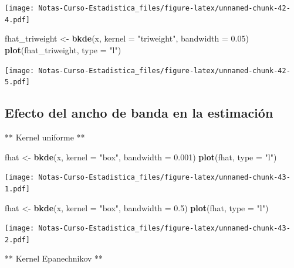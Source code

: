 \documentclass[
  12pt,
]{book}
\newenvironment{Shaded}{\begin{snugshade}}{\end{snugshade}}
\newcommand{\DataTypeTok}[1]{\textcolor[rgb]{0.13,0.29,0.53}{#1}}
\newcommand{\FloatTok}[1]{\textcolor[rgb]{0.00,0.00,0.81}{#1}}
\newcommand{\KeywordTok}[1]{\textcolor[rgb]{0.13,0.29,0.53}{\textbf{#1}}}
\newcommand{\NormalTok}[1]{#1}
\newcommand{\StringTok}[1]{\textcolor[rgb]{0.31,0.60,0.02}{#1}}
\theoremstyle{definition}
\theoremstyle{definition}
\theoremstyle{definition}
\theoremstyle{remark}
\begin{document}
\texttt{[image: Notas-Curso-Estadistica\_files/figure-latex/unnamed-chunk-42-4.pdf]}

\begin{Shaded}
\begin{Highlighting}[]
\NormalTok{fhat_triweight <-}\StringTok{ }\KeywordTok{bkde}\NormalTok{(x, }\DataTypeTok{kernel =} \StringTok{"triweight"}\NormalTok{, }\DataTypeTok{bandwidth =} \FloatTok{0.05}\NormalTok{)}
\KeywordTok{plot}\NormalTok{(fhat_triweight, }\DataTypeTok{type =} \StringTok{"l"}\NormalTok{)}
\end{Highlighting}
\end{Shaded}

\texttt{[image: Notas-Curso-Estadistica\_files/figure-latex/unnamed-chunk-42-5.pdf]}

\hypertarget{efecto-del-ancho-de-banda-en-la-estimaciuxf3n}{%
\subsection{Efecto del ancho de banda en la estimación}\label{efecto-del-ancho-de-banda-en-la-estimaciuxf3n}}

** Kernel uniforme **

\begin{Shaded}
\begin{Highlighting}[]
\NormalTok{fhat <-}\StringTok{ }\KeywordTok{bkde}\NormalTok{(x, }\DataTypeTok{kernel =} \StringTok{"box"}\NormalTok{, }\DataTypeTok{bandwidth =} \FloatTok{0.001}\NormalTok{)}
\KeywordTok{plot}\NormalTok{(fhat, }\DataTypeTok{type =} \StringTok{"l"}\NormalTok{)}
\end{Highlighting}
\end{Shaded}

\texttt{[image: Notas-Curso-Estadistica\_files/figure-latex/unnamed-chunk-43-1.pdf]}

\begin{Shaded}
\begin{Highlighting}[]
\NormalTok{fhat <-}\StringTok{ }\KeywordTok{bkde}\NormalTok{(x, }\DataTypeTok{kernel =} \StringTok{"box"}\NormalTok{, }\DataTypeTok{bandwidth =} \FloatTok{0.5}\NormalTok{)}
\KeywordTok{plot}\NormalTok{(fhat, }\DataTypeTok{type =} \StringTok{"l"}\NormalTok{)}
\end{Highlighting}
\end{Shaded}

\texttt{[image: Notas-Curso-Estadistica\_files/figure-latex/unnamed-chunk-43-2.pdf]}

** Kernel Epanechnikov **
\end{document}

